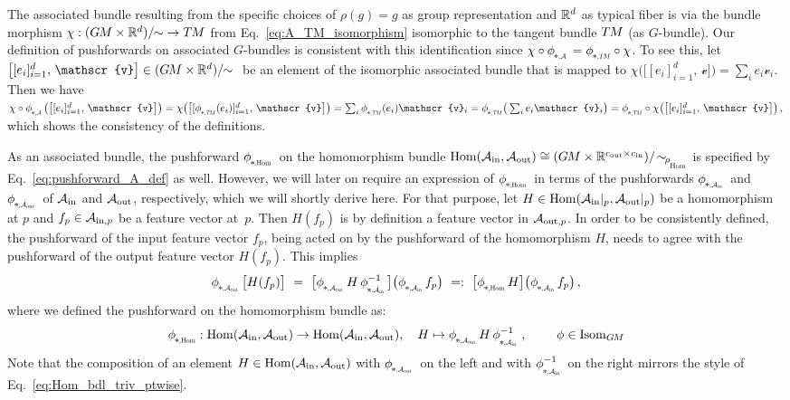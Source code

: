 The associated bundle resulting from the specific choices of $\rho(g)=g$ as group representation and $\mathbb{R}^d$ as typical fiber is via the bundle morphism $\chi:(G\mkern-1.4muM\times\mathbb{R}^d)/\!\!\sim\; \to T\mkern-1.5muM$ from Eq.~\eqref{eq:A_TM_isomorphism} isomorphic to the tangent bundle $T\mkern-1.5muM$ (as $G$-bundle).
Our definition of pushforwards on associated $G$-bundles is consistent with this identification since $\chi\circ\dphiA = \dphiTM\circ\chi$.
To see this, let $\big[[e_i]_{i=1}^d,\, \mathscr{v}\big] \in (\GM\times\R^d)/\!\!\sim\;$ be an element of the isomorphic associated bundle that is mapped to $\chi\big(\big[ [e_i]_{i=1}^d,\, \mathscr{v} \big]\big) = \sum_i e_i \mathscr{v}_i$.
Then we have
${\chi \circ \dphiA \big( \big[[e_i]_{i=1}^d,\, \mathscr{v}\big] \big)}
 = \chi \big( \big[[\dphiTM(e_i)]_{i=1}^d,\, \mathscr{v}\big] \big)
 = \sum_i \dphiTM(e_i) \mathscr{v}_i
 = \dphiTM \big(\sum_i e_i \mathscr{v}_i \big)
 = \dphiTM \circ \chi\big(\big[ [e_i]_{i=1}^d,\, \mathscr{v} \big]\big) \,,
$
which shows the consistency of the definitions.


As an associated bundle, the pushforward $\dphiHom$ on the homomorphism bundle $\Hom(\Ain,\Aout) \cong {(\GM\times\R^{\cout\times\cin})/\!\sim_{\!\rhoHom}}$ is specified by Eq.~\eqref{eq:pushforward_A_def} as well.
However, we will later on require an expression of $\dphiHom$ in terms of the pushforwards $\dphiAin$ and $\dphiAout$ of $\mathcal{A}_\textup{in}$ and $\mathcal{A}_\textup{out}$, respectively, which we will shortly derive here.
For that purpose, let $H\in \operatorname{Hom}(\mathcal{A}_\textup{in}|_p,\mathcal{A}_\textup{out}|_p)$ be a homomorphism at $p$ and $f_p\in \mathcal{A}_{\textup{in},p}$ be a feature vector at~$p$.
Then $H(f_p)$ is by definition a feature vector in $\mathcal{A}_{\textup{out},p}$.
In order to be consistently defined, the pushforward of the input feature vector $f_p$, being acted on by the pushforward of the homomorphism $H$, needs to agree with the pushforward of the output feature vector $H(f_p)$.
This implies
\begin{align}
    \dphiAout \big[ H(f_p) \big]
    \ =\  \big[ \dphiAout H\, \dphiAin^{-1} \big] \big( \dphiAin f_p \big)
    \ =:\ \big[ \dphiHom H \big] \big( \dphiAin f_p \big) \,,
\end{align}
where we defined the pushforward on the homomorphism bundle as:
\begin{align}\label{eq:pushforward_Hom_def}
    \dphiHom\!: \Hom(\Ain,\Aout) \to \Hom(\Ain,\Aout), \quad
    H \mapsto
    \dphiAout H\, \dphiAininv \,,
    \qquad\ \phi \in \IsomGM
\end{align}
Note that the composition of an element $H\in \operatorname{Hom}(\mathcal{A}_\textup{in},\mathcal{A}_\textup{out})$ with $\dphiAout$ on the left and with $\dphiAininv$ on the right mirrors the style of Eq.~\eqref{eq:Hom_bdl_triv_ptwise}.






